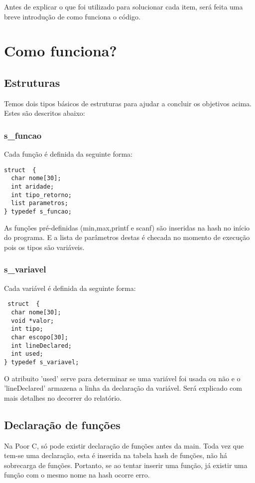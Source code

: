 \documentclass[a4paper,10pt]{article}
\begin{document}
Antes de explicar o que foi utilizado para solucionar cada item, será feita uma breve introdução de como funciona o código.

\section{Como funciona?}

\subsection{Estruturas}
Temos dois tipos básicos de estruturas para ajudar a concluir os objetivos acima. Estes são descritos abaixo:
\subsubsection{s\_funcao}

Cada função é definida da seguinte forma:

\begin{lstlisting}
struct  {
  char nome[30];
  int aridade;
  int tipo_retorno;
  list parametros;
} typedef s_funcao;
\end{lstlisting}

As funções pré-definidas (min,max,printf e scanf) são inseridas na hash no início do programa. E a lista de parâmetros destas é checada no momento de execução pois os tipos são
variáveis.

\subsubsection{s\_variavel}
Cada variável é definida da seguinte forma:
\begin{lstlisting}
 struct  {
  char nome[30];
  void *valor;
  int tipo;
  char escopo[30];
  int lineDeclared;
  int used;
} typedef s_variavel;
\end{lstlisting}

O atribuito 'used' serve para determinar se uma variável foi usada ou não e o 'lineDeclared' armazena a linha da declaração da variável. Será explicado com mais detalhes no decorrer do relatório.

\subsection{Declaração de funções}
Na Poor C, só pode existir declaração de funções antes da main. Toda vez que tem-se uma declaração, esta é inserida na tabela hash de funções, não há sobrecarga de funções. Portanto, se ao tentar
inserir uma função, já existir uma função com o mesmo nome na hash ocorre erro.
\end{document}
